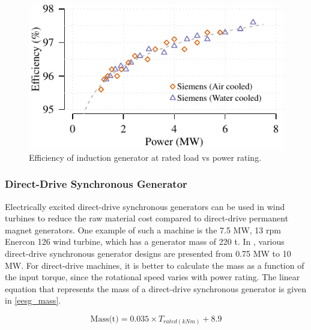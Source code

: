 \documentclass{article}\usepackage{graphicx, color}
\makeatletter
\def\maxwidth{ %
  \ifdim\Gin@nat@width>\linewidth
    \linewidth
  \else
    \Gin@nat@width
  \fi
}
\newenvironment{knitrout}{}{} %
\makeatother
\begin{document}
\begin{knitrout}
\color{fgcolor}\begin{figure}[]


{\centering \includegraphics[width=\maxwidth]{figure/induction_generator_efficiency} 

}

\caption[Efficiency of induction generator at rated load vs power rating]{Efficiency of induction generator at rated load vs power rating.\label{fig:induction_generator_efficiency}}
\end{figure}


\end{knitrout}



\subsubsection{Direct-Drive Synchronous Generator}

Electrically excited direct-drive synchronous generators can be used in wind turbines to reduce the raw material cost compared to direct-drive permanent magnet generators. One example of such a machine is the 7.5 MW, 13 rpm Enercon 126 wind turbine, which has a generator mass of 220 t.
In \cite{upwind2011}, various direct-drive synchronous generator designs are presented from 0.75 MW to 10 MW. For direct-drive machines, it is better to calculate the mass as a function of the input torque, since the rotational speed varies with power rating. The linear equation that represents the mass of a direct-drive synchronous generator is given in \autoref{eesg_mass}.

\begin{equation}
  \text{Mass(t)} = 0.035 \times {T_{rated(kNm)}} + 8.9
  \label{eesg_mass}
\end{equation}
\end{document}
